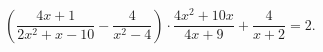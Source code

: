 \begin{ex}[type=equation]
	\begin{condition}
		$\left(\dfrac{4x+ 1}{2x^2 + x - 10} - \dfrac{4}{x^2 - 4}\right)\cdot\dfrac{4x^2 + 10x}{4x + 9} + \dfrac{4}{x + 2} = 2.$
	\end{condition}
\end{ex}